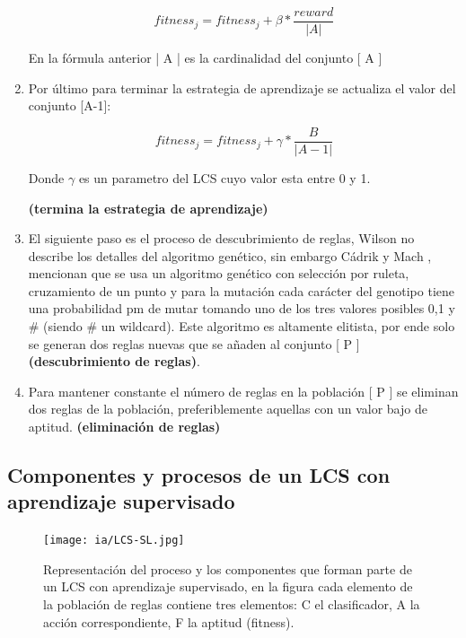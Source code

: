 \documentclass[11pt,fleqn]{book} %
\begin{document}
\begin{enumerate}
\begin{equation}
fitness_j=fitness_j+\beta*\frac{reward}{|A|}
\end{equation}

En la fórmula anterior | A | es la cardinalidad del conjunto [ A ]
\item Por último para terminar la estrategia de aprendizaje se actualiza el valor del conjunto [A-1]:

\begin{equation}
fitness_j = fitness_j +\gamma*\frac{B}{|A-1|} 
\end{equation}

Donde $\gamma$ es un parametro del LCS cuyo valor esta entre 0 y 1.

\textbf{(termina la estrategia de aprendizaje)}

\item El siguiente paso es el proceso de descubrimiento de reglas, Wilson \cite{wilste_zcs} no describe los detalles del algoritmo genético, sin embargo C{\'a}drik y Mach \cite{cadrik_zcs}, mencionan que se usa un algoritmo genético con selección por ruleta, cruzamiento de un punto y para la mutación cada carácter del genotipo tiene una probabilidad pm de mutar tomando uno de los tres valores posibles 0,1 y \# (siendo \# un wildcard). Este algoritmo es altamente elitista, por ende solo se generan dos reglas nuevas que se añaden al conjunto [ P ] \textbf{(descubrimiento de reglas)}.

\item Para mantener constante el número de reglas en la población [ P ] se eliminan dos reglas de la población, preferiblemente aquellas con un valor bajo de aptitud. \textbf{(eliminación de reglas)}

\end{enumerate}

\clearpage
\subsection{Componentes y procesos de un LCS con aprendizaje supervisado} 

\begin{figure}[ht]
\centering\texttt{[image: ia/LCS-SL.jpg]}
\caption{Representación del proceso y los componentes que forman parte de un LCS con aprendizaje supervisado, en la figura cada elemento de la población de reglas contiene tres elementos: {C} el clasificador, {A} la acción correspondiente, { F } la aptitud (fitness).}

\label{fig:LCS-SL} 
\end{figure}
\end{document}
